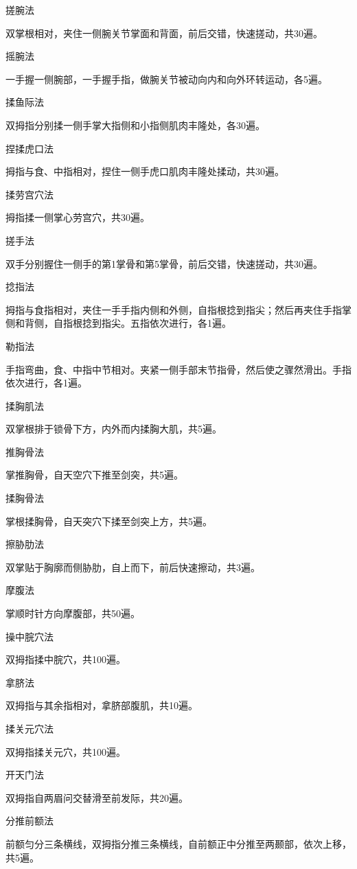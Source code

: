 \documentclass[12pt,UTF8,openany]{ctexbook}
\begin{document}
搓腕法

双掌根相对，夹住一侧腕关节掌面和背面，前后交错，快速搓动，共30遍。

摇腕法

一手握一侧腕部，一手握手指，做腕关节被动向内和向外环转运动，各5遍。

揉鱼际法

双拇指分别揉一侧手掌大指侧和小指侧肌肉丰隆处，各30遍。

捏揉虎口法

拇指与食、中指相对，捏住一侧手虎口肌肉丰隆处揉动，共30遍。

揉劳宫穴法

拇指揉一侧掌心劳宫穴，共30遍。

搓手法

双手分别握住一侧手的第1掌骨和第5掌骨，前后交错，快速搓动，共30遍。

捻指法

拇指与食指相对，夹住一手手指内侧和外侧，自指根捻到指尖；然后再夹住手指掌侧和背侧，自指根捻到指尖。五指依次进行，各1遍。

勒指法

手指弯曲，食、中指中节相对。夹紧一侧手部末节指骨，然后使之骤然滑出。手指依次进行，各1遍。

揉胸肌法

双掌根排于锁骨下方，内外而内揉胸大肌，共5遍。

推胸骨法

掌推胸骨，自天空穴下推至剑突，共5遍。

揉胸骨法

掌根揉胸骨，自天突穴下揉至剑突上方，共5遍。

擦胁肋法

双掌贴于胸廓而侧胁肋，自上而下，前后快速擦动，共3遍。

摩腹法

掌顺时针方向摩腹部，共50遍。

操中脘穴法

双拇指揉中脘穴，共100遍。

拿脐法

双拇指与其余指相对，拿脐部腹肌，共10遍。

揉关元穴法

双拇指揉关元穴，共100遍。

开天门法

双拇指自两眉问交替滑至前发际，共20遍。

分推前额法

前额匀分三条横线，双拇指分推三条横线，自前额正中分推至两颞部，依次上移，共5遍。
\end{document}
